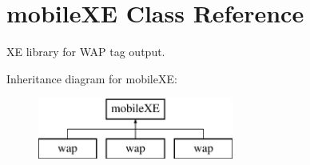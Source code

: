 \hypertarget{classmobileXE}{}\section{mobile\+X\+E Class Reference}
\label{classmobileXE}


X\+E library for W\+A\+P tag output.  


Inheritance diagram for mobile\+X\+E\+:\begin{figure}[H]
\begin{center}
\leavevmode
\includegraphics[height=2.000000cm]{classmobileXE}
\end{center}
\end{figure}
